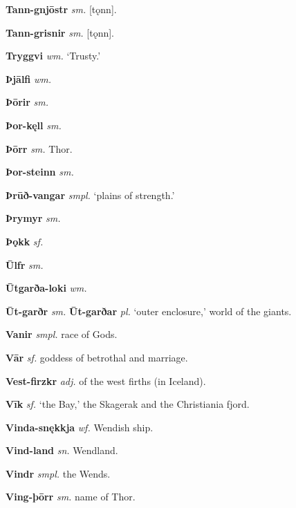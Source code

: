 \documentclass[12pt,letterpaper]{book}
\begin{document}
\vspace{\baselineskip}

\noindent
\textbf{Tann-gnjōstr} \textit{sm.} [tǫnn].

\noindent
\textbf{Tann-grisnir} \textit{sm.} [tǫnn].

\noindent
\textbf{Tryggvi} \textit{wm.} `Trusty.'

\vspace{\baselineskip}

\noindent
\textbf{Þjālfi} \textit{wm.} 

\noindent
\textbf{Þōrir} \textit{sm.} 

\noindent
\textbf{Þor-kęll} \textit{sm.} 

\noindent
\textbf{Þōrr} \textit{sm.} Thor.

\noindent
\textbf{Þor-steinn} \textit{sm.} 

\noindent
\textbf{Þrūð-vangar} \textit{smpl.} `plains of strength.'

\noindent
\textbf{Þrymyr} \textit{sm.} 

\noindent
\textbf{Þǫkk} \textit{sf.} 

\vspace{\baselineskip}

\noindent
\textbf{Ūlfr} \textit{sm.} 

\noindent
\textbf{Ūtgarða-loki} \textit{wm.} 

\noindent
\textbf{Ūt-garðr} \textit{sm.} \textbf{Ūt-garðar} \textit{pl.} `outer enclosure,'
	world of the giants.

\vspace{\baselineskip}

\noindent
\textbf{Vanir} \textit{smpl.} race of Gods.

\noindent
\textbf{Vār} \textit{sf.} goddess of betrothal and marriage.

\noindent
\textbf{Vest-firzkr} \textit{adj.} of the west firths (in Iceland).

\noindent
\textbf{Vīk} \textit{sf.} `the Bay,' the Skagerak and the Christiania fjord.

\noindent
\textbf{Vinda-snękkja} \textit{wf.} Wendish ship.

\noindent
\textbf{Vind-land} \textit{sn.} Wendland.

\noindent
\textbf{Vindr} \textit{smpl.} the Wends.

\noindent
\textbf{Ving-þōrr} \textit{sm.} name of Thor.
\end{document}
